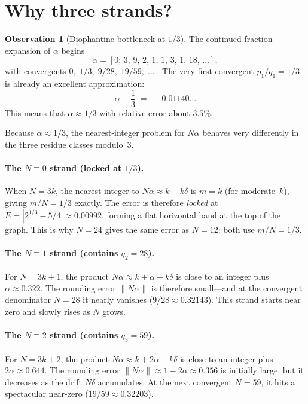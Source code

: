 \documentclass[12pt]{article}
\theoremstyle{plain}
\theoremstyle{definition}
\newtheorem{observation}[theorem]{Observation}
\theoremstyle{remark}
\numberwithin{equation}{section}
\begin{document}
\section{Why three strands?}
\label{sec:three-strands}

\begin{observation}[Diophantine bottleneck at $1/3$]
The continued fraction expansion of $\alpha$ begins
\[
  \alpha = [0;\, 3,\, 9,\, 2,\, 1,\, 1,\, 3,\, 1,\, 18,\, \ldots],
\]
with convergents $0,\; 1/3,\; 9/28,\; 19/59,\; \ldots\;$.
The very first convergent $p_1/q_1 = 1/3$ is already an excellent
approximation:
\[
  \alpha - \frac{1}{3} \;=\; -0.01140\ldots
\]
This means that $\alpha \approx 1/3$ with relative error about $3.5\%$.
\end{observation}

Because $\alpha \approx 1/3$, the nearest-integer problem for $N\alpha$
behaves very differently in the three residue classes modulo~$3$.

\paragraph{The $N \equiv 0$ strand (locked at $1/3$).}
When $N = 3k$, the nearest integer to $N\alpha \approx k - k\delta$ is
$m = k$ (for moderate~$k$), giving $m/N = 1/3$ exactly.  The error is
therefore \emph{locked} at $E = |2^{1/3} - 5/4| \approx 0.00992$,
forming a flat horizontal band at the top of the graph.
This is why $N = 24$ gives the same error as $N = 12$: both use
$m/N = 1/3$.

\paragraph{The $N \equiv 1$ strand (contains $q_2 = 28$).}
For $N = 3k+1$, the product $N\alpha \approx k + \alpha - k\delta$
is close to an integer plus $\alpha \approx 0.322$.  The rounding
error $\|N\alpha\|$ is therefore small---and at the convergent
denominator $N = 28$ it nearly vanishes ($9/28 \approx 0.32143$).
This strand starts near zero and slowly rises as $N$ grows.

\paragraph{The $N \equiv 2$ strand (contains $q_3 = 59$).}
For $N = 3k+2$, the product $N\alpha \approx k + 2\alpha - k\delta$
is close to an integer plus $2\alpha \approx 0.644$.  The rounding
error $\|N\alpha\| \approx 1 - 2\alpha \approx 0.356$ is initially
large, but it decreases as the drift $N\delta$ accumulates.  At the
next convergent $N = 59$, it hits a spectacular near-zero
($19/59 \approx 0.32203$).
\end{document}
